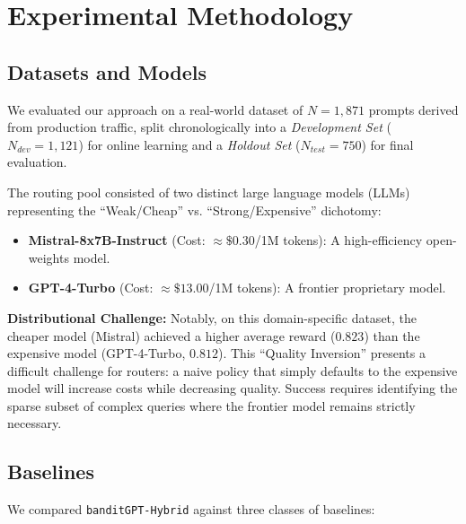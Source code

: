 
\section{Experimental Methodology}

\subsection{Datasets and Models}

We evaluated our approach on a real-world dataset of $N=1,871$ prompts derived from production traffic, split chronologically into a \textit{Development Set} ($N_{dev}=1,121$) for online learning and a \textit{Holdout Set} ($N_{test}=750$) for final evaluation.

The routing pool consisted of two distinct large language models (LLMs) representing the ``Weak/Cheap'' vs. ``Strong/Expensive'' dichotomy:

\begin{itemize}
    \item \textbf{Mistral-8x7B-Instruct} (Cost: $\approx\$0.30$/1M tokens): A high-efficiency open-weights model.
    \item \textbf{GPT-4-Turbo} (Cost: $\approx\$13.00$/1M tokens): A frontier proprietary model.
\end{itemize}

\textbf{Distributional Challenge:} Notably, on this domain-specific dataset, the cheaper model (Mistral) achieved a higher average reward ($0.823$) than the expensive model (GPT-4-Turbo, $0.812$). This ``Quality Inversion'' presents a difficult challenge for routers: a naive policy that simply defaults to the expensive model will increase costs while decreasing quality. Success requires identifying the sparse subset of complex queries where the frontier model remains strictly necessary.

\subsection{Baselines}

We compared \texttt{banditGPT-Hybrid} against three classes of baselines:

